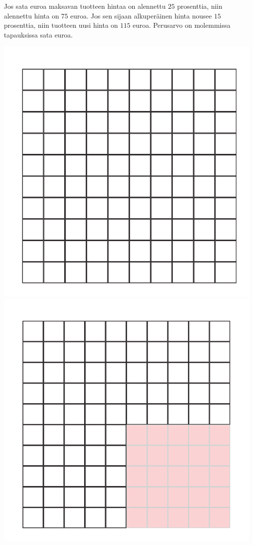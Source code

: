 \begin{esimerkki}
Jos sata euroa maksavan tuotteen hintaa on alennettu $25$ prosenttia, niin alennettu hinta on $75$ euroa. Jos sen sijaan alkuperäinen hinta nousee $15$ prosenttia, niin tuotteen uusi hinta on $115$ euroa. Perusarvo on molemmissa tapauksissa sata euroa.
    
    \begin{center}
        \includegraphics[scale=.25]{pictures/Kuva13-1-100.pdf}
        \includegraphics[scale=.25]{pictures/Kuva13-2-75.pdf}

\end{center}
\end{esimerkki}
